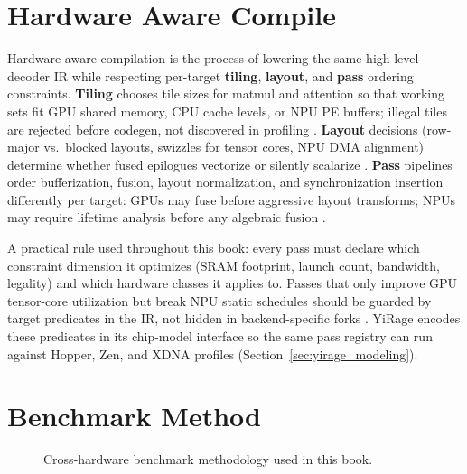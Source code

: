 \section{Hardware Aware Compile}
\label{sec:hardware_aware_compile}

Hardware-aware compilation is the process of lowering the same high-level decoder IR while respecting per-target \textbf{tiling}, \textbf{layout}, and \textbf{pass} ordering constraints.
\textbf{Tiling} chooses tile sizes for matmul and attention so that working sets fit GPU shared memory, CPU cache levels, or NPU PE buffers; illegal tiles are rejected before codegen, not discovered in profiling \citep{dlbook,nvidia2022hopper}.
\textbf{Layout} decisions (row-major vs.\ blocked layouts, swizzles for tensor cores, NPU DMA alignment) determine whether fused epilogues vectorize or silently scalarize \citep{semianalysis2024tma,amd2024xdna}.
\textbf{Pass} pipelines order bufferization, fusion, layout normalization, and synchronization insertion differently per target: GPUs may fuse before aggressive layout transforms; NPUs may require lifetime analysis before any algebraic fusion \citep{amd2024aie,patel2025llminference}.

A practical rule used throughout this book: every pass must declare which constraint dimension it optimizes (SRAM footprint, launch count, bandwidth, legality) and which hardware classes it applies to.
Passes that only improve GPU tensor-core utilization but break NPU static schedules should be guarded by target predicates in the IR, not hidden in backend-specific forks \citep{memoryfloor2026}.
YiRage encodes these predicates in its chip-model interface so the same pass registry can run against Hopper, Zen, and XDNA profiles (Section~\ref{sec:yirage_modeling}).

\section{Benchmark Method}
\label{sec:benchmark_method}
\begin{figure}[t]
\centering
{}
\caption{Cross-hardware benchmark methodology used in this book.}
\label{fig:benchmark_method}
\end{figure}

